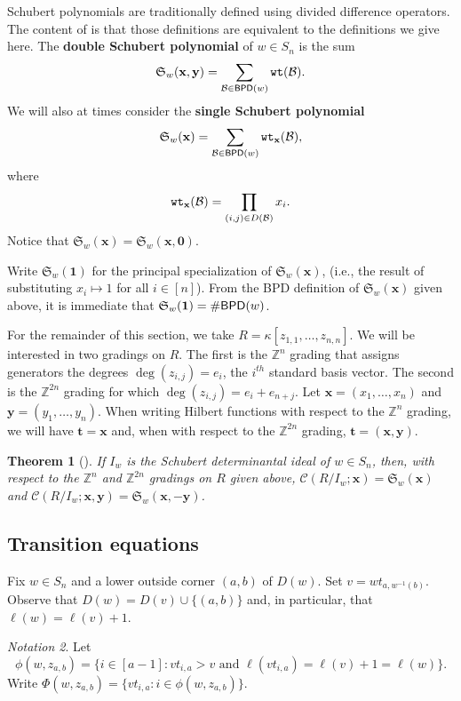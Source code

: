 \documentclass[12pt,reqno]{amsart}
\newtheorem{theorem}{Theorem}[section]
\newtheorem{Main Conjecture}[theorem]{Main Conjecture}
\theoremstyle{remark}
\newtheorem{notation}[theorem]{Notation}
\theoremstyle{plain}
\newcommand{\mydef}[1]{{\bf #1}}
\newcommand{\bpd}{{\sf BPD}}
\newcommand{\wt}{{\tt wt}}
\newcommand{\ZZ}{\mathbb{Z}}
\begin{document}
 Schubert polynomials are traditionally defined using divided difference operators.  The content of \cite[Theorem~5.13]{LLS21} is that those definitions are equivalent to the definitions we give here.   The \mydef{double Schubert polynomial} of $w \in S_n$ is the sum
\[\mathfrak S_w(\mathbf x, \mathbf y)=\sum_{\mathcal B\in \bpd(w)}\wt(\mathcal B).\]  We will also at times consider the \mydef{single Schubert polynomial} \[\mathfrak S_w(\mathbf x)=\sum_{\mathcal B\in \bpd(w)}\wt_{\mathbf x}(\mathcal B),\] where \[ \wt_{\mathbf x}(\mathcal B)=\prod_{(i,j)\in D(\mathcal B)}x_i.\]
Notice that $\mathfrak S_w(\mathbf x)=\mathfrak S_w(\mathbf x,\mathbf 0)$.



Write $\mathfrak S_w(\mathbf 1)$ for the principal specialization of $\mathfrak S_w(\mathbf x)$, (i.e., the result of substituting $x_i\mapsto 1$ for all $i\in[n]$).  From the BPD definition of $\mathfrak S_w(\mathbf x)$ given above, it is immediate that $\mathfrak S_w(\mathbf 1)=\#\bpd(w)$.

For the remainder of this section, we take $R=\kappa[z_{1,1},\ldots,z_{n,n}]$.  We will be interested in two gradings on $R$.  
The first is the $\mathbb Z^n$ grading that assigns generators the degrees $\deg(z_{i,j})=e_i$, the $i^{th}$ standard basis vector.  The second is the $\mathbb Z^{2n}$ grading for which $\deg(z_{i,j})=e_i+e_{n+j}$. Let $\mathbf x=(x_1,\ldots,x_n)$ and $\mathbf y=(y_1,\ldots,y_n)$.  When writing Hilbert functions with respect to the $\ZZ^n$ grading, we will have $\mathbf t=\mathbf x$ and, when with respect to the $\mathbb Z^{2n}$ grading, $\mathbf t=(\mathbf x,\mathbf y)$.


 \begin{theorem}[\cite{FR03,KM05}]
 \label{thm:SchubMultiDeg}
If $I_w$ is the Schubert determinantal ideal of $w \in S_n$, then, with respect to the $\mathbb Z^n$ and $\mathbb Z^{2n}$ gradings on $R$ given above, $\mathcal C(R/I_w;\mathbf x)=\mathfrak S_w(\mathbf x)$ and $\mathcal C(R/I_w;\mathbf x,\mathbf y)=\mathfrak S_w(\mathbf x, -\mathbf{y})$.
\end{theorem}


 \subsection{Transition equations}
 Fix $w \in S_n$ and a lower outside corner $(a,b)$ of $D(w)$.  
 Set $v=wt_{a,w^{-1}(b)}$.  Observe that $D(w) = D(v) \cup \{(a,b)\}$ and, in particular, that $\ell(w) = \ell(v)+1$.  \begin{notation} Let \[
 \phi(w,z_{a,b})=\{i\in [a-1]:vt_{i,a}>v \text{ and } \ell(vt_{i,a})=\ell(v)+1 = \ell(w)\}.
 \] Write $\Phi(w,z_{a,b})=\{vt_{i,a}:i\in \phi(w,z_{a,b})\}$.  
 \end{notation}
\end{document}
